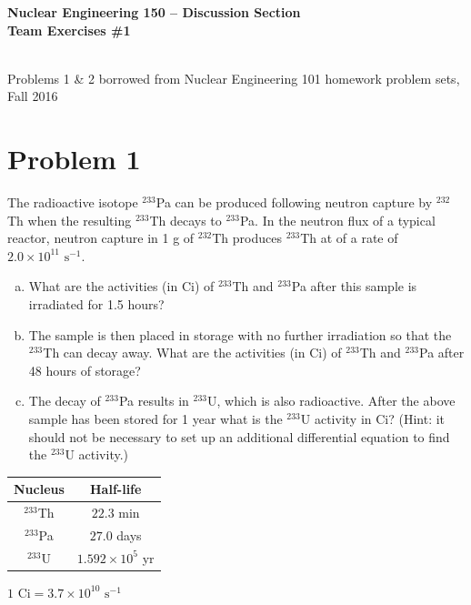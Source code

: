 \documentclass{report}
\begin{document}
\begin{center}
\textbf{\large Nuclear Engineering 150 -- Discussion Section}\\ 
\textbf{Team Exercises \#1}

\-\\
{\small *Problems 1 \& 2 borrowed from Nuclear Engineering 101 homework problem sets, Fall 2016}
\end{center}

\section*{Problem 1}
The radioactive isotope $^{233}$Pa can be produced following neutron capture by $^{232}$Th when the resulting $^{233}$Th decays to $^{233}$Pa. In the neutron flux of a typical reactor, neutron capture in 1 g of $^{232}$Th produces $^{233}$Th at of a rate of $2.0 \times 10^{11}\text{ s}^{-1}$.
\begin{enumerate}[a)]
\item What are the activities (in Ci) of $^{233}$Th and $^{233}$Pa after this sample is irradiated for 1.5 hours?
\item The sample is then placed in storage with no further irradiation so that the $^{233}$Th can decay away. What are
the activities (in Ci) of $^{233}$Th and $^{233}$Pa after 48 hours of storage?
\item The decay of $^{233}$Pa results in $^{233}$U, which is also radioactive. After the above sample has been stored for 1 year what is the $^{233}$U activity in Ci? (Hint: it should not be necessary to set up an additional differential equation to find the $^{233}$U activity.)
\end{enumerate}

\begin{table}[htbp]
	\centering
	\begin{tabular}{|c|c|}
			\hline
			Nucleus		&	Half-life \\
			\hline
			$^{233}$Th	&  $22.3$ min\\
			$^{233}$Pa	&  $27.0$ days\\
			$^{233}$U	&  $1.592 \times 10^5$ yr\\
			\hline
	\end{tabular}
	\label{tab:design-specs}
\end{table}
\begin{center}$1\text{ Ci} = 3.7 \times 10^{10}\text{ s}^{-1}$\end{center}
\end{document}
